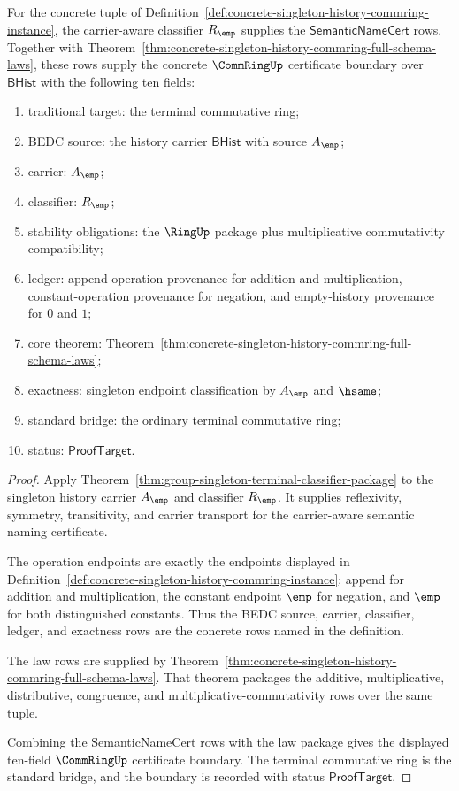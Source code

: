\begin{theorem}
\label{thm:concrete-singleton-history-commring-certificate-boundary}
For the concrete tuple of
Definition~\ref{def:concrete-singleton-history-commring-instance}, the
carrier-aware classifier $R_{\emp}$ supplies the
$\mathsf{SemanticNameCert}$ rows. Together with
Theorem~\ref{thm:concrete-singleton-history-commring-full-schema-laws}, these
rows supply the concrete $\CommRingUp$ certificate boundary over
$\mathsf{BHist}$ with the following ten fields:
\begin{enumerate}
  \item traditional target: the terminal commutative ring;
  \item BEDC source: the history carrier $\mathsf{BHist}$ with source
  $A_{\emp}$;
  \item carrier: $A_{\emp}$;
  \item classifier: $R_{\emp}$;
  \item stability obligations: the $\RingUp$ package plus multiplicative
  commutativity compatibility;
  \item ledger: append-operation provenance for addition and multiplication,
  constant-operation provenance for negation, and empty-history provenance for
  $0$ and $1$;
  \item core theorem:
  Theorem~\ref{thm:concrete-singleton-history-commring-full-schema-laws};
  \item exactness: singleton endpoint classification by $A_{\emp}$ and
  $\hsame$;
  \item standard bridge: the ordinary terminal commutative ring;
  \item status: $\mathsf{ProofTarget}$.
\end{enumerate}
\end{theorem}
\begin{proof}
Apply Theorem~\ref{thm:group-singleton-terminal-classifier-package} to the
singleton history carrier $A_{\emp}$ and classifier $R_{\emp}$. It supplies
reflexivity, symmetry, transitivity, and carrier transport for the
carrier-aware semantic naming certificate.

The operation endpoints are exactly the endpoints displayed in
Definition~\ref{def:concrete-singleton-history-commring-instance}: append for
addition and multiplication, the constant endpoint $\emp$ for negation, and
$\emp$ for both distinguished constants. Thus the BEDC source, carrier,
classifier, ledger, and exactness rows are the concrete rows named in the
definition.

The law rows are supplied by
Theorem~\ref{thm:concrete-singleton-history-commring-full-schema-laws}. That
theorem packages the additive, multiplicative, distributive, congruence, and
multiplicative-commutativity rows over the same tuple.

Combining the SemanticNameCert rows with the law package gives the displayed
ten-field $\CommRingUp$ certificate boundary. The terminal commutative ring is
the standard bridge, and the boundary is recorded with status
$\mathsf{ProofTarget}$.
\end{proof}

